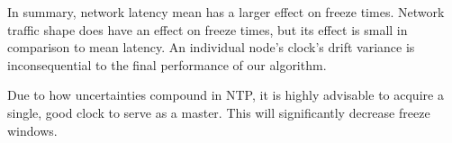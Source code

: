 In summary, network latency mean has a larger effect on freeze
times. Network traffic shape does have an effect on freeze times, but
its effect is small in comparison to mean latency. An individual
node’s clock’s drift variance is inconsequential to the final
performance of our algorithm.

Due to how uncertainties compound in NTP, it is highly advisable to
acquire a single, good clock to serve as a master. This will
significantly decrease freeze windows.

